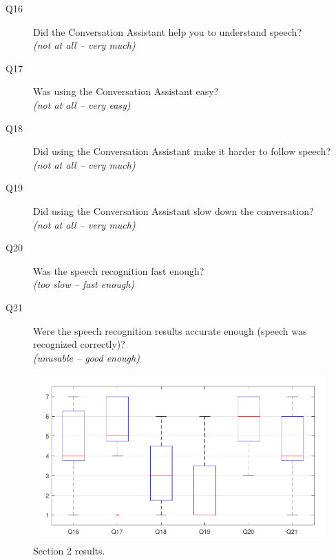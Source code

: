 \documentclass[english, 12pt, a4paper, pdftex, elec, utf8]{aaltothesis}
\begin{document}
\begin{description}
    \item[Q16] Did the Conversation Assistant help you to understand speech? \\ \textit{(not at all -- very much)}
    \item[Q17] Was using the Conversation Assistant easy? \\ \textit{(not at all -- very easy)}
    \item[Q18] Did using the Conversation Assistant make it harder to follow speech? \\ \textit{(not at all -- very much)}
    \item[Q19] Did using the Conversation Assistant slow down the conversation? \\ \textit{(not at all  -- very much)}
    \item[Q20] Was the speech recognition fast enough? \\ \textit{(too slow -- fast enough)}
    \item[Q21] Were the speech recognition results accurate enough (speech was recognized correctly)? \\ \textit{(unusable -- good enough)}
\end{description}
\begin{figure}[h!]
    \centering
    \includegraphics[width=\textwidth]{T2_box3.pdf}
    \caption{Section 2 results.}
    \label{fig:results3}
\end{figure}
\end{document}
